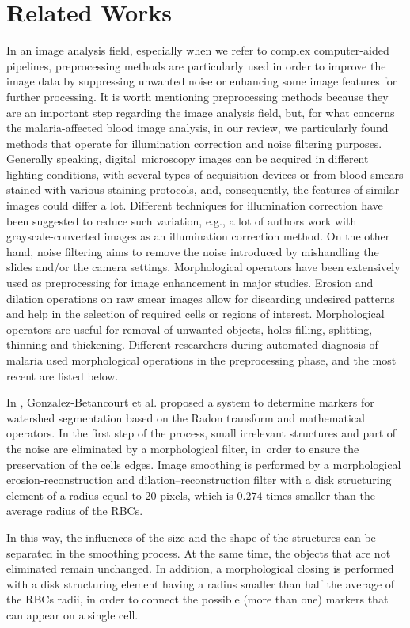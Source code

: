 \documentclass[final,a4paper,12pt,english]{UnicaPhdThesis3}
\begin{document}
\section{Related Works}
In an image analysis field, especially when we refer to complex computer-aided pipelines, preprocessing methods are particularly used in order to improve the image data by suppressing unwanted noise or enhancing some image features for further processing.
It is worth mentioning preprocessing methods because they are an important step regarding the image analysis field, but, for what concerns the malaria-affected blood image analysis, in our review, we particularly found methods that operate for illumination correction and noise filtering purposes.
Generally speaking, digital~microscopy images can be acquired in different lighting conditions, with several types of acquisition devices or from blood smears stained with various staining protocols, and, consequently, the features of similar images could differ a lot.
Different techniques for illumination correction have been suggested to reduce such variation, e.g., a lot of authors work with grayscale-converted images as an illumination correction method.
On the other hand, noise filtering aims to remove the noise introduced by mishandling the slides and/or the camera settings.
Morphological operators have been extensively used as preprocessing for image enhancement in major studies.
Erosion and dilation operations on raw smear images allow for discarding undesired patterns and help in the selection of required cells or regions of interest. Morphological operators are useful for removal of unwanted
objects, holes filling, splitting, thinning and thickening. Different researchers during automated diagnosis of malaria used morphological operations in the preprocessing phase, and the most recent are listed below.

In \cite{Gonzalez2016}, Gonzalez-Betancourt et al. proposed a system to determine markers for watershed segmentation based on the Radon transform and mathematical operators. In the first step of the process, small irrelevant structures and part of the noise are eliminated by a morphological filter, in~order to ensure the preservation of the cells edges. Image smoothing is performed by a morphological erosion-reconstruction and dilation--reconstruction filter with a disk structuring element of a radius equal to 20 pixels, which is $0.274$ times smaller than the average radius of the RBCs. 

In this way, the influences of the size and the shape of the structures can be separated in the smoothing process. At the same time, the objects that are not eliminated remain unchanged. In addition, a morphological closing is performed with a disk structuring element having a radius smaller than half the average of the RBCs radii, in order to connect the possible (more than one) markers that can appear on a single cell.
\end{document}
